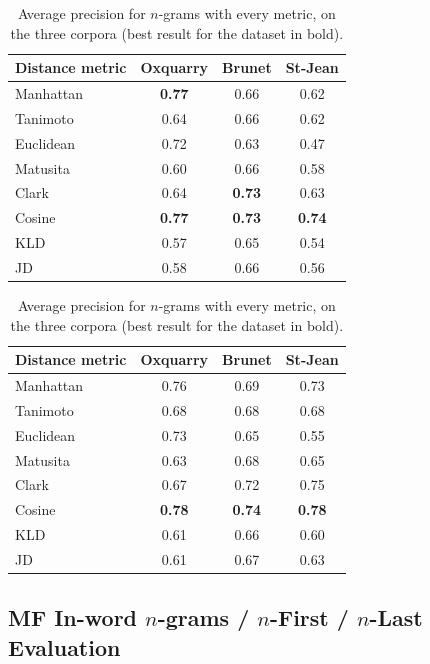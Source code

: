 \begin{table}[!t]
  \centering
  \caption{Average precision for $n$-grams with every metric, on the three corpora (best result for the dataset in bold).}
  \label{tab:letter_ngrams}

  \begin{tabular}{l c c c}
    \toprule
    Distance metric & Oxquarry & Brunet & St-Jean \\
    \midrule
    Manhattan & \textbf{0.77} & 0.66 & 0.62 \\
    Tanimoto & 0.64 & 0.66 & 0.62 \\
    Euclidean & 0.72 & 0.63 & 0.47 \\
    Matusita & 0.60 & 0.66 & 0.58 \\
    Clark & 0.64 & \textbf{0.73} & 0.63 \\
    Cosine & \textbf{0.77} & \textbf{0.73} & \textbf{0.74} \\
    KLD & 0.57 & 0.65 & 0.54 \\
    JD & 0.58 & 0.66 & 0.56 \\
    \bottomrule
  \end{tabular}

  \vspace{0.5cm}

  \begin{tabular}{l c c c}
    \toprule
    Distance metric & Oxquarry & Brunet & St-Jean \\
    \midrule
    Manhattan & 0.76 & 0.69 & 0.73 \\
    Tanimoto & 0.68 & 0.68 & 0.68 \\
    Euclidean & 0.73 & 0.65 & 0.55 \\
    Matusita & 0.63 & 0.68 & 0.65 \\
    Clark & 0.67 & 0.72 & 0.75 \\
    Cosine & \textbf{0.78} & \textbf{0.74} & \textbf{0.78} \\
    KLD & 0.61 & 0.66 & 0.60 \\
    JD & 0.61 & 0.67 & 0.63 \\
    \bottomrule
  \end{tabular}
\end{table}

\subsection{MF In-word $n$-grams / $n$-First / $n$-Last Evaluation}

